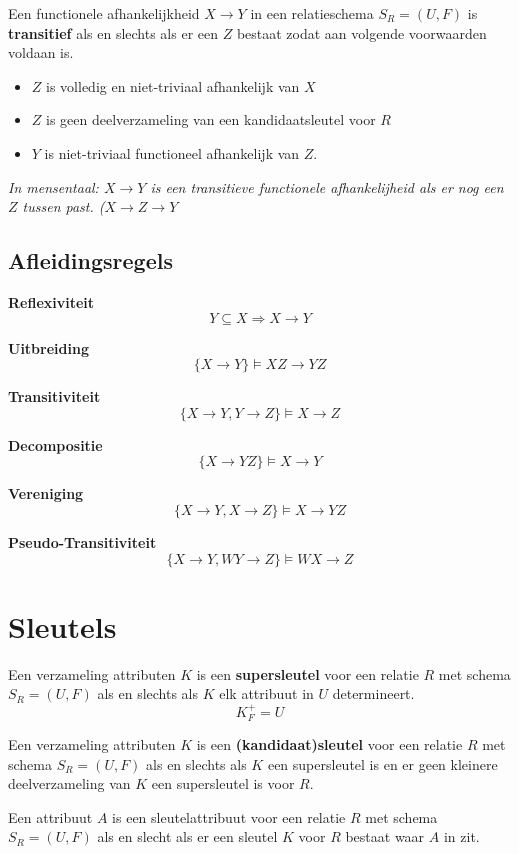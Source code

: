 \documentclass[normaalvormen.tex]{subfiles}
\begin{document}
\begin{de}
Een functionele afhankelijkheid $X\rightarrow Y$ in een relatieschema $S_{R} = (U,F)$ is \textbf{transitief} als en slechts als er een $Z$ bestaat zodat aan volgende voorwaarden voldaan is.
\begin{itemize}
\item $Z$ is volledig en niet-triviaal afhankelijk van $X$
\item $Z$ is geen deelverzameling van een kandidaatsleutel voor $R$
\item $Y$ is niet-triviaal functioneel afhankelijk van $Z$.
\end{itemize}
\emph{In mensentaal: $X\rightarrow Y$ is een transitieve functionele afhankelijheid als er nog een $Z$ tussen past. ($X\rightarrow Z\rightarrow Y$}
\end{de}
\subsection{Afleidingsregels}
\begin{reg} \textbf{Reflexiviteit}
\[
Y \subseteq X \Rightarrow X \rightarrow Y
\]
\end{reg}
\begin{reg} \textbf{Uitbreiding}
\[
\{X \rightarrow Y\} \models XZ \rightarrow YZ
\]
\end{reg}
\begin{reg} \textbf{Transitiviteit}
\[
\{X \rightarrow Y, Y \rightarrow Z\} \models X \rightarrow Z
\]
\end{reg} 
\begin{reg}\textbf{Decompositie}
\[
\{X \rightarrow YZ\} \models X \rightarrow Y
\]
\end{reg}
\begin{reg} \textbf{Vereniging}
\[
\{X\rightarrow Y, X\rightarrow Z \} \models X\rightarrow YZ
\]
\end{reg}
\begin{reg} \textbf{Pseudo-Transitiviteit}
\[
\{ X\rightarrow Y, WY \rightarrow Z \} \models WX\rightarrow Z
\]
\end{reg}

\section{Sleutels}
\begin{de}
Een verzameling attributen $K$ is een \textbf{supersleutel} voor een relatie $R$ met schema $S_{R} = (U,F)$ als en slechts als $K$ elk attribuut in $U$ determineert.
\[
K_{F}^{+} = U
\]
\end{de}
\begin{de}
Een verzameling attributen $K$ is een \textbf{(kandidaat)sleutel}  voor een relatie $R$ met schema $S_{R} = (U,F)$ als en slechts als $K$ een supersleutel is en er geen kleinere deelverzameling van $K$ een supersleutel is voor $R$.
\end{de}
\begin{de}
Een attribuut $A$ is een sleutelattribuut voor een relatie $R$ met schema $S_{R} = (U,F)$ als en slecht als er een sleutel $K$ voor $R$ bestaat waar $A$ in zit.
\end{de}
\end{document}
